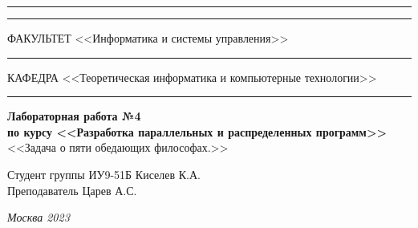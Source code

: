\documentclass[a4paper, 14pt]{extarticle}
\begin{document}
\begin{titlepage}
\vspace{-25pt}
\hspace{-35pt}\rule{\textwidth}{2.3pt}

\vspace*{-20.3pt}
\hspace{-35pt}\rule{\textwidth}{0.4pt}

\vspace{1.5ex}
\hspace{-35pt} \noindent \small ФАКУЛЬТЕТ\hspace{80pt} <<Информатика и системы управления>>

\vspace*{-16pt}
\hspace{47pt}\rule{0.83\textwidth}{0.4pt}

\vspace{0.5ex}
\hspace{-35pt} \noindent \small КАФЕДРА\hspace{50pt} <<Теоретическая информатика и компьютерные технологии>>

\vspace*{-16pt}
\hspace{30pt}\rule{0.866\textwidth}{0.4pt}
  
\vspace{11em}

\begin{center}
\Large {\bf Лабораторная работа №4 } \\ 
\large {\bf по курсу <<Разработка параллельных и распределенных программ>>} \\

\large <<Задача о пяти обедающих философах.>> \\
\end{center}\normalsize

\vspace{8em}


\begin{flushright}
  {Студент группы ИУ9-51Б Киселев К.А. \hspace*{15pt}\\ 
  \vspace{2ex}
  Преподаватель Царев А.С.\hspace*{15pt}}
\end{flushright}

\bigskip

\vfill
 

\begin{center}
\textsl{Москва 2023}
\end{center}
\end{titlepage}
\end{document}
